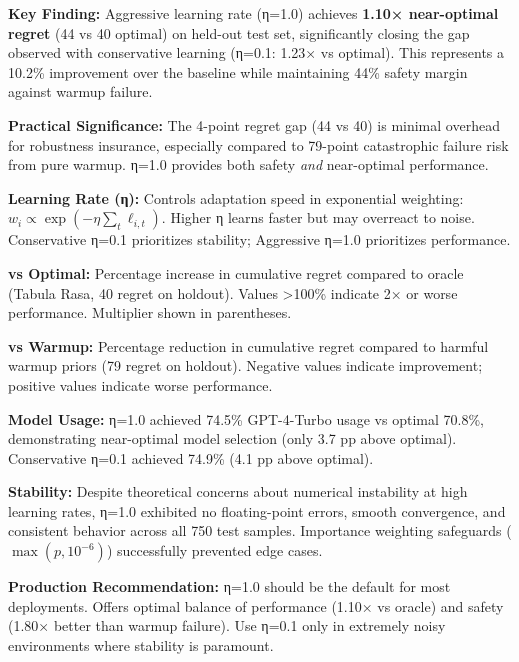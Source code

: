 \begin{table}[t]
\begin{tablenotes}
\item \textbf{Key Finding:} Aggressive learning rate (η=1.0) achieves \textbf{1.10× near-optimal regret} (44 vs 40 optimal) on held-out test set, significantly closing the gap observed with conservative learning (η=0.1: 1.23× vs optimal). This represents a 10.2\% improvement over the baseline while maintaining 44\% safety margin against warmup failure.

\item \textbf{Practical Significance:} The 4-point regret gap (44 vs 40) is minimal overhead for robustness insurance, especially compared to 79-point catastrophic failure risk from pure warmup. η=1.0 provides both safety \emph{and} near-optimal performance.

\item \textbf{Learning Rate (η):} Controls adaptation speed in exponential weighting: $w_i \propto \exp(-\eta \sum_t \ell_{i,t})$. Higher η learns faster but may overreact to noise. Conservative η=0.1 prioritizes stability; Aggressive η=1.0 prioritizes performance.

\item \textbf{vs Optimal:} Percentage increase in cumulative regret compared to oracle (Tabula Rasa, 40 regret on holdout). Values >100\% indicate 2× or worse performance. Multiplier shown in parentheses.

\item \textbf{vs Warmup:} Percentage reduction in cumulative regret compared to harmful warmup priors (79 regret on holdout). Negative values indicate improvement; positive values indicate worse performance.

\item \textbf{Model Usage:} η=1.0 achieved 74.5\% GPT-4-Turbo usage vs optimal 70.8\%, demonstrating near-optimal model selection (only 3.7 pp above optimal). Conservative η=0.1 achieved 74.9\% (4.1 pp above optimal).

\item \textbf{Stability:} Despite theoretical concerns about numerical instability at high learning rates, η=1.0 exhibited no floating-point errors, smooth convergence, and consistent behavior across all 750 test samples. Importance weighting safeguards ($\max(p, 10^{-6})$) successfully prevented edge cases.

\item \textbf{Production Recommendation:} η=1.0 should be the default for most deployments. Offers optimal balance of performance (1.10× vs oracle) and safety (1.80× better than warmup failure). Use η=0.1 only in extremely noisy environments where stability is paramount.
\end{tablenotes}
\end{table}

